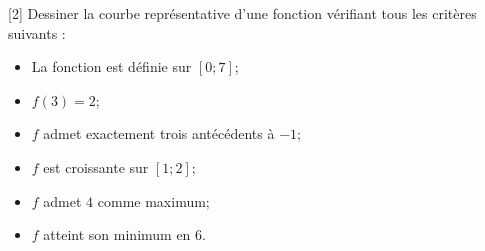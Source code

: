 \documentclass{exam}
\begin{document}
\begin{questions}
\begin{parts}
\begin{center}
\end{center}
\end{parts}
\vspace*{0.5cm}
[2]
Dessiner la courbe représentative d'une fonction vérifiant tous les critères suivants :
\begin{itemize}
\item La fonction est définie sur $[0;7]$;
\item $f(3) = 2$;
\item $f$ admet exactement trois antécédents à $-1$;
\item $f$ est croissante sur $[1;2]$;
\item $f$ admet $4$ comme maximum;
\item $f$ atteint son minimum en $6$.
\end{itemize}
\end{questions}
\end{document}
